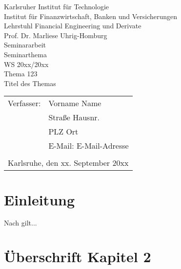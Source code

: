 \documentclass[a4paper,12pt]{article}
\renewcommand{\baselinestretch}{1.3}
\begin{document}
\begin{titlepage}
\begin{center}
{\Large Karlsruher Institut für Technologie\\[0.4cm]
Institut f\"{u}r Finanzwirtschaft, Banken und Versicherungen\\[0.3cm]
Lehrstuhl Financial Engineering und Derivate\\[0.3cm]
Prof. Dr. Marliese Uhrig-Homburg}\\[3.5cm]
{\large Seminararbeit}\\[0.3cm]
{\large Seminarthema}\\[0.3cm]
{\large WS 20xx/20xx}\\[0.7cm]
{\large Thema 123} \\[0.3cm]
{\Huge Titel des Themas}\\[6cm]
\end{center}
\renewcommand{\baselinestretch}{1.2}\small\normalsize
\begin{tabular}{ll}
        Verfasser:  & Vorname Name\\
                    & Straße Hausnr.\\
                    & PLZ Ort\\
					& E-Mail: E-Mail-Adresse\\\\
        \multicolumn{2}{l}{Karlsruhe, den xx. September 20xx}
    \end{tabular}
    \vfill
\end{titlepage}

\setcounter{page}{1}%
\tableofcontents %
\newpage
\listoffigures {} %
\newpage
\listoftables {} %
\newpage
\setcounter{page}{1}\renewcommand{\thepage}{\arabic{page}}

\section{Einleitung\label{sec:einleitung}}

Nach \citet{Hull2000} gilt...  %

\section{Überschrift Kapitel 2\label{sec:kap2}}
\end{document}
